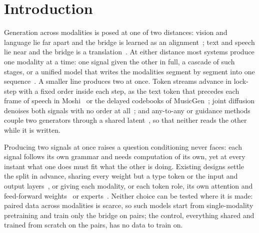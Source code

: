 \section{Introduction}
\label{sec:intro}

Generation across modalities is posed at one of two distances: vision
and language lie far apart and the bridge is learned as an
alignment~\cite{clip,flamingo}; text and speech lie near and the
bridge is a translation~\cite{tts,asr}. At either distance most
systems produce one modality at a time: one signal given the other in
full, a cascade of such stages, or a unified model that writes the
modalities segment by segment into one
sequence~\cite{chameleon,transfusion,ualm,bagel}. A smaller line
produces two at once. Token streams advance in lock-step with a fixed
order inside each step, as the text token that precedes each frame of
speech in Moshi~\cite{moshi} or the delayed codebooks of
MusicGen~\cite{musicgen}; joint diffusion denoises both signals with
no order at all~\cite{mmdiffusion}; and any-to-any or guidance methods
couple two generators through a shared latent~\cite{codi,seeing_hearing},
so that neither reads the other while it is written.

Producing two signals at once raises a question conditioning never
faces: each signal follows its own grammar and needs computation of
its own, yet at every instant what one does must fit what the other is
doing. Existing designs settle the split in advance, sharing every
weight but a type token or the input and output
layers~\cite{chameleon,transfusion,ualm,moshi}, or giving each
modality, or each token role, its own attention and feed-forward
weights~\cite{mot,bagel} or experts~\cite{moma}. Neither
choice can be tested where it is made: paired data across modalities
is scarce, so such models start from single-modality pretraining and
train only the bridge on pairs; the control, everything shared and
trained from scratch on the pairs, has no data to train on.

